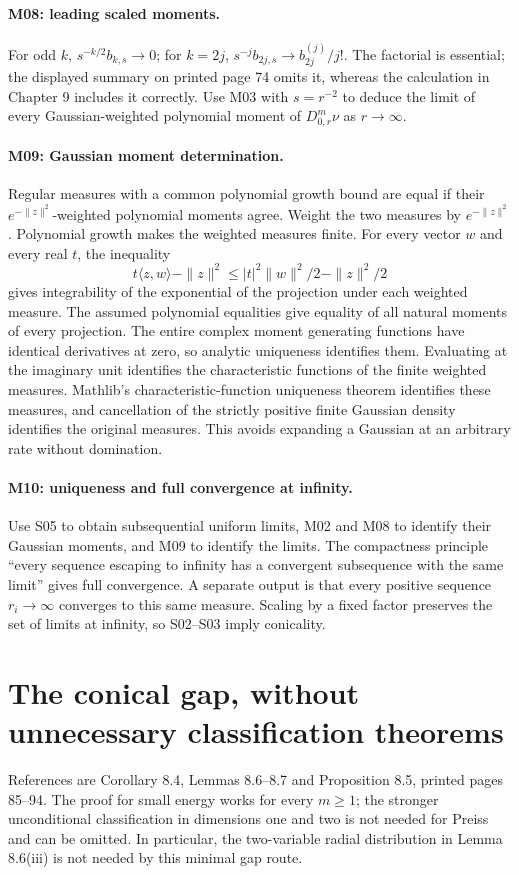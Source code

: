 \paragraph{M08: leading scaled moments.}
For odd $k$, $s^{-k/2}b_{k,s}\to0$; for $k=2j$,
$s^{-j}b_{2j,s}\to b_{2j}^{(j)}/j!$.
The factorial is essential; the displayed summary on printed page 74 omits it,
whereas the calculation in Chapter 9 includes it correctly.
Use M03 with $s=r^{-2}$ to deduce the limit of every Gaussian-weighted
polynomial moment of $D^m_{0,r}\nu$ as $r\to\infty$.

\paragraph{M09: Gaussian moment determination.}
Regular measures with a common polynomial growth bound are equal if their
$e^{-\|z\|^2}$-weighted polynomial moments agree.
Weight the two measures by $e^{-\|z\|^2}$. Polynomial growth makes the weighted measures finite. For every vector $w$ and every real $t$, the inequality
\[
t\langle z,w\rangle-\|z\|^2\leq |t|^2\|w\|^2/2-\|z\|^2/2
\]
gives integrability of the exponential of the projection under each weighted measure. The assumed polynomial equalities give equality of all natural moments of every projection. The entire complex moment generating functions have identical derivatives at zero, so analytic uniqueness identifies them. Evaluating at the imaginary unit identifies the characteristic functions of the finite weighted measures. Mathlib's characteristic-function uniqueness theorem identifies these measures, and cancellation of the strictly positive finite Gaussian density identifies the original measures. This avoids expanding a Gaussian at an arbitrary rate without domination.

\paragraph{M10: uniqueness and full convergence at infinity.}
Use S05 to obtain subsequential uniform limits, M02 and M08 to identify their
Gaussian moments, and M09 to identify the limits. The compactness principle
``every sequence escaping to infinity has a convergent subsequence with the
same limit'' gives full convergence. A separate output is that every positive
sequence $r_i\to\infty$ converges to this same measure. Scaling by a fixed
factor preserves the set of limits at infinity, so S02--S03 imply conicality.

\section{The conical gap, without unnecessary classification theorems}
References are Corollary 8.4, Lemmas 8.6--8.7 and Proposition 8.5,
printed pages 85--94. The proof for small energy works for every $m\geq1$;
the stronger unconditional classification in dimensions one and two is not
needed for Preiss and can be omitted. In particular, the two-variable radial
distribution in Lemma 8.6(iii) is not needed by this minimal gap route.

